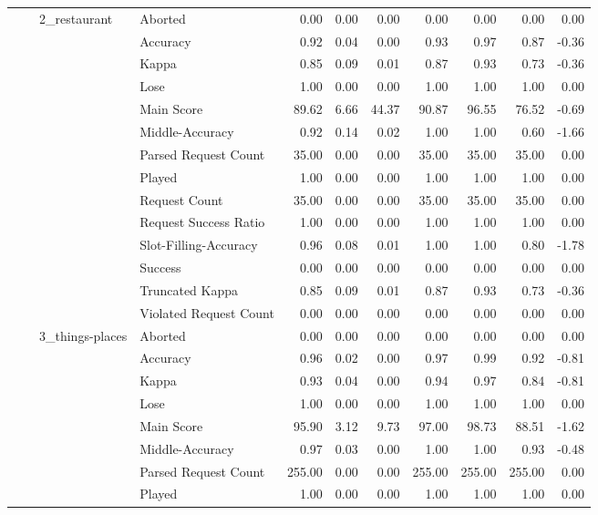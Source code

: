\begin{tabular}{llllrrrrrrr}
\cline{3-11}
 &  & \multirow[t]{14}{*}{2_restaurant} & Aborted & 0.00 & 0.00 & 0.00 & 0.00 & 0.00 & 0.00 & 0.00 \\
 &  &  & Accuracy & 0.92 & 0.04 & 0.00 & 0.93 & 0.97 & 0.87 & -0.36 \\
 &  &  & Kappa & 0.85 & 0.09 & 0.01 & 0.87 & 0.93 & 0.73 & -0.36 \\
 &  &  & Lose & 1.00 & 0.00 & 0.00 & 1.00 & 1.00 & 1.00 & 0.00 \\
 &  &  & Main Score & 89.62 & 6.66 & 44.37 & 90.87 & 96.55 & 76.52 & -0.69 \\
 &  &  & Middle-Accuracy & 0.92 & 0.14 & 0.02 & 1.00 & 1.00 & 0.60 & -1.66 \\
 &  &  & Parsed Request Count & 35.00 & 0.00 & 0.00 & 35.00 & 35.00 & 35.00 & 0.00 \\
 &  &  & Played & 1.00 & 0.00 & 0.00 & 1.00 & 1.00 & 1.00 & 0.00 \\
 &  &  & Request Count & 35.00 & 0.00 & 0.00 & 35.00 & 35.00 & 35.00 & 0.00 \\
 &  &  & Request Success Ratio & 1.00 & 0.00 & 0.00 & 1.00 & 1.00 & 1.00 & 0.00 \\
 &  &  & Slot-Filling-Accuracy & 0.96 & 0.08 & 0.01 & 1.00 & 1.00 & 0.80 & -1.78 \\
 &  &  & Success & 0.00 & 0.00 & 0.00 & 0.00 & 0.00 & 0.00 & 0.00 \\
 &  &  & Truncated Kappa & 0.85 & 0.09 & 0.01 & 0.87 & 0.93 & 0.73 & -0.36 \\
 &  &  & Violated Request Count & 0.00 & 0.00 & 0.00 & 0.00 & 0.00 & 0.00 & 0.00 \\
\cline{3-11}
 &  & \multirow[t]{14}{*}{3_things-places} & Aborted & 0.00 & 0.00 & 0.00 & 0.00 & 0.00 & 0.00 & 0.00 \\
 &  &  & Accuracy & 0.96 & 0.02 & 0.00 & 0.97 & 0.99 & 0.92 & -0.81 \\
 &  &  & Kappa & 0.93 & 0.04 & 0.00 & 0.94 & 0.97 & 0.84 & -0.81 \\
 &  &  & Lose & 1.00 & 0.00 & 0.00 & 1.00 & 1.00 & 1.00 & 0.00 \\
 &  &  & Main Score & 95.90 & 3.12 & 9.73 & 97.00 & 98.73 & 88.51 & -1.62 \\
 &  &  & Middle-Accuracy & 0.97 & 0.03 & 0.00 & 1.00 & 1.00 & 0.93 & -0.48 \\
 &  &  & Parsed Request Count & 255.00 & 0.00 & 0.00 & 255.00 & 255.00 & 255.00 & 0.00 \\
 &  &  & Played & 1.00 & 0.00 & 0.00 & 1.00 & 1.00 & 1.00 & 0.00 \\

\end{tabular}
